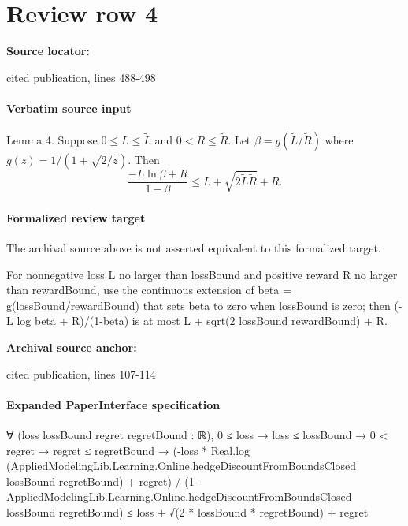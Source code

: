 \documentclass[10pt]{article}
\begin{document}
\section*{Review row 4}
\textbf{Source locator:} {\footnotesize\raggedright cited publication, lines 488-\allowbreak{}498\par}
\paragraph{Verbatim source input}
\begin{ReviewVerbatim}
Lemma 4. Suppose $0\leq L\leq\widetilde L$ and
$0<R\leq\widetilde R$. Let
$\beta=g(\widetilde L/\widetilde R)$ where
$g(z)=1/(1+\sqrt{2/z})$. Then
$$
\frac{-L\ln\beta+R}{1-\beta}
\leq L+\sqrt{2\widetilde L\widetilde R}+R.
$$
\end{ReviewVerbatim}


\paragraph{Formalized review target}
The archival source above is not asserted equivalent to this formalized target.
\begin{ReviewVerbatim}
For nonnegative loss L no larger than lossBound and positive reward R no larger than rewardBound, use the continuous extension of beta = g(lossBound/rewardBound) that sets beta to zero when lossBound is zero; then (-L log beta + R)/(1-beta) is at most L + sqrt(2 lossBound rewardBound) + R.
\end{ReviewVerbatim}

\textbf{Archival source anchor:} {\footnotesize\raggedright cited publication, lines 107-\allowbreak{}114\par}
\paragraph{Expanded PaperInterface specification}
\begin{ReviewVerbatim}
∀ (loss lossBound regret regretBound : ℝ),
  0 ≤ loss →
    loss ≤ lossBound →
      0 < regret →
        regret ≤ regretBound →
          (-loss * Real.log (AppliedModelingLib.Learning.Online.hedgeDiscountFromBoundsClosed lossBound regretBound) +
                regret) /
              (1 - AppliedModelingLib.Learning.Online.hedgeDiscountFromBoundsClosed lossBound regretBound) ≤
            loss + √(2 * lossBound * regretBound) + regret
\end{ReviewVerbatim}
\end{document}
